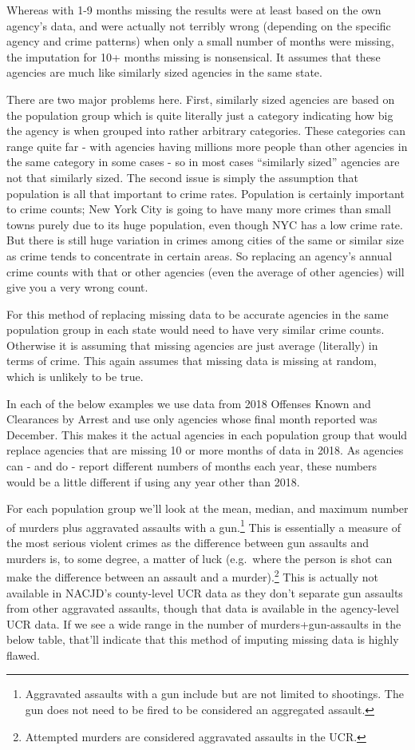 \documentclass[
  12pt,
  openany]{book}
\begin{document}
Whereas with 1-9 months missing the results were at least based on the own agency's data, and were actually not terribly wrong (depending on the specific agency and crime patterns) when only a small number of months were missing, the imputation for 10+ months missing is nonsensical. It assumes that these agencies are much like similarly sized agencies in the same state.

There are two major problems here. First, similarly sized agencies are based on the population group which is quite literally just a category indicating how big the agency is when grouped into rather arbitrary categories. These categories can range quite far - with agencies having millions more people than other agencies in the same category in some cases - so in most cases ``similarly sized'' agencies are not that similarly sized. The second issue is simply the assumption that population is all that important to crime rates. Population is certainly important to crime counts; New York City is going to have many more crimes than small towns purely due to its huge population, even though NYC has a low crime rate. But there is still huge variation in crimes among cities of the same or similar size as crime tends to concentrate in certain areas. So replacing an agency's annual crime counts with that or other agencies (even the average of other agencies) will give you a very wrong count.

For this method of replacing missing data to be accurate agencies in the same population group in each state would need to have very similar crime counts. Otherwise it is assuming that missing agencies are just average (literally) in terms of crime. This again assumes that missing data is missing at random, which is unlikely to be true.

In each of the below examples we use data from 2018 Offenses Known and Clearances by Arrest and use only agencies whose final month reported was December. This makes it the actual agencies in each population group that would replace agencies that are missing 10 or more months of data in 2018. As agencies can - and do - report different numbers of months each year, these numbers would be a little different if using any year other than 2018.

For each population group we'll look at the mean, median, and maximum number of murders plus aggravated assaults with a gun.\footnote{Aggravated assaults with a gun include but are not limited to shootings. The gun does not need to be fired to be considered an aggregated assault.} This is essentially a measure of the most serious violent crimes as the difference between gun assaults and murders is, to some degree, a matter of luck (e.g.~where the person is shot can make the difference between an assault and a murder).\footnote{Attempted murders are considered aggravated assaults in the UCR.} This is actually not available in NACJD's county-level UCR data as they don't separate gun assaults from other aggravated assaults, though that data is available in the agency-level UCR data. If we see a wide range in the number of murders+gun-assaults in the below table, that'll indicate that this method of imputing missing data is highly flawed.
\end{document}
